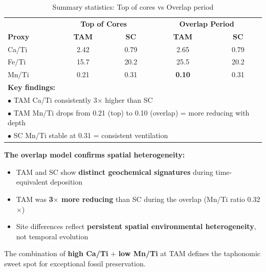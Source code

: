 \documentclass[11pt,a4paper]{article}
\begin{document}
\begin{table}[H]
\centering
\caption{Summary statistics: Top of cores vs Overlap period}
\begin{tabular}{lcccc}
\toprule
& \multicolumn{2}{c}{\textbf{Top of Cores}} & \multicolumn{2}{c}{\textbf{Overlap Period}} \\
\textbf{Proxy} & \textbf{TAM} & \textbf{SC} & \textbf{TAM} & \textbf{SC} \\
\midrule
Ca/Ti & 2.42 & 0.79 & 2.65 & 0.79 \\
Fe/Ti & 15.7 & 20.2 & 25.5 & 20.2 \\
Mn/Ti & 0.21 & 0.31 & \textbf{0.10} & 0.31 \\
\midrule
\multicolumn{5}{l}{\textbf{Key findings:}} \\
\multicolumn{5}{l}{$\bullet$ TAM Ca/Ti consistently 3$\times$ higher than SC} \\
\multicolumn{5}{l}{$\bullet$ TAM Mn/Ti drops from 0.21 (top) to 0.10 (overlap) = more reducing with depth} \\
\multicolumn{5}{l}{$\bullet$ SC Mn/Ti stable at 0.31 = consistent ventilation} \\
\bottomrule
\end{tabular}
\end{table}

\begin{tcolorbox}[colback=gray!5, colframe=gray!50!black, title=Take-Home Message]
\textbf{The overlap model confirms spatial heterogeneity:}

\begin{itemize}[noitemsep]
    \item TAM and SC show \textbf{distinct geochemical signatures} during time-equivalent deposition
    \item TAM was \textbf{3$\times$ more reducing} than SC during the overlap (Mn/Ti ratio 0.32$\times$)
    \item Site differences reflect \textbf{persistent spatial environmental heterogeneity}, not temporal evolution
\end{itemize}

The combination of \textbf{high Ca/Ti} + \textbf{low Mn/Ti} at TAM defines the taphonomic sweet spot for exceptional fossil preservation.
\end{tcolorbox}
\end{document}

